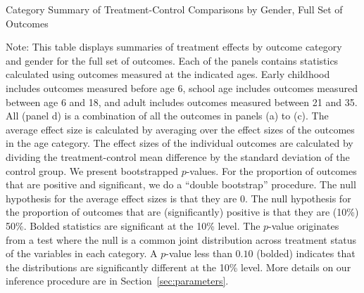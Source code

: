 \begin{table}[h!]
\centering
\begin{threeparttable}
\caption{Category Summary of Treatment-Control Comparisons by Gender, Full Set of Outcomes}\label{tab:rosenbaum-table-cats-exp-TvC-big}

\begin{tablenotes}
\item  \tiny Note:  This table displays summaries of treatment effects by outcome category and gender for the full set of outcomes. Each of the panels contains statistics calculated using outcomes measured at the indicated ages. Early childhood includes outcomes measured before age 6, school age includes outcomes measured between age 6 and 18, and adult includes outcomes measured between 21 and 35. All (panel d) is a combination of all the outcomes in panels (a) to (c). The average effect size is calculated by averaging over the effect sizes of the outcomes in the age category. The effect sizes of the individual outcomes are calculated by dividing the treatment-control mean difference by the standard deviation of the control group. We present bootstrapped $p$-values. For the proportion of outcomes that are positive and significant, we do a ``double bootstrap'' procedure. The null hypothesis for the average effect sizes is that they are 0. The null hypothesis for the proportion of outcomes that are (significantly) positive is that they are (10\%) 50\%. Bolded statistics are significant at the 10\% level. The \citet{Rosenbaum_2005_Distribution_JRSS} $p$-value originates from a test where the null is a common joint distribution  across treatment status of the variables in each category. A $p$-value less than $0.10$ (bolded) indicates that the distributions are significantly different at the 10\% level. More details on our inference procedure are in Section~\ref{sec:parameters}.
\end{tablenotes}
\end{threeparttable}
\end{table}

